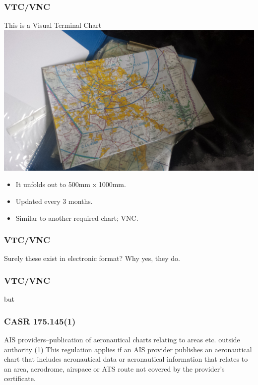 \begin{frame}
\frametitle{VTC/VNC}
\begin{block}{This is a Visual Terminal Chart}
\includegraphics[height=0.3\textheight]{image/vtc.png}
\begin{itemize}
\item<1-> It unfolds out to 500mm x 1000mm.
\item<2-> Updated every 3 months.
\item<3-> Similar to another required chart; VNC.
\end{itemize}
\end{block}
\end{frame}

\begin{frame}
\frametitle{VTC/VNC}
\begin{block}{Surely these exist in electronic format?}
Why yes, they do.
\end{block}
\end{frame}

\begin{frame}
\frametitle{VTC/VNC}
\large
\begin{center}
but
\end{center}
\end{frame}

\begin{frame}
\frametitle{CASR 175.145(1)}
\begin{block}{AIS providers--publication of aeronautical charts relating to areas etc. outside authority}
(1) This regulation applies if an AIS provider publishes an aeronautical chart that includes aeronautical data or aeronautical information that relates to an area, aerodrome, airspace or ATS route not covered by the provider's certificate.
\end{block}
\end{frame}

